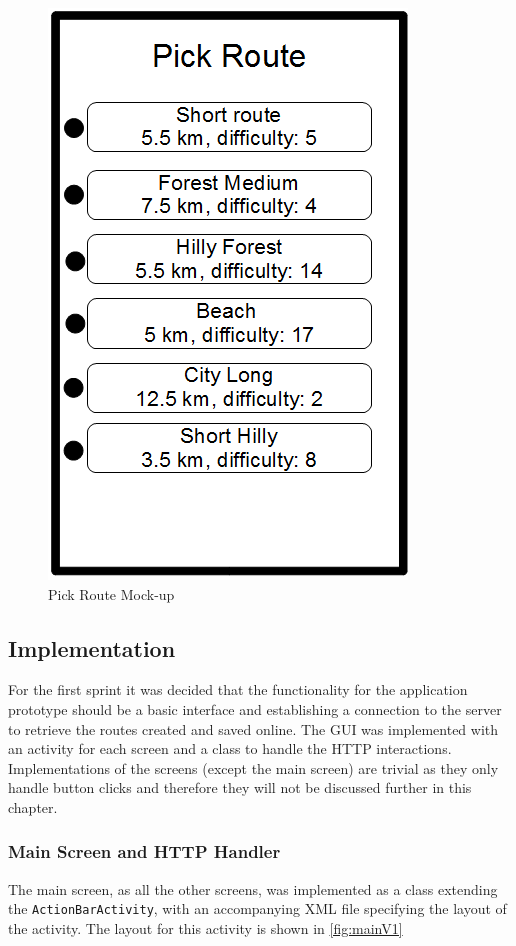\begin{figure}[ht]
\begin{center}
 \caption{Pick Route Mock-up}
 \label{fig:pickRouteMock}
 \includegraphics[scale=0.4]{img/pickRouteMock.png}
\end{center}
\end{figure}

\subsection{Implementation}
For the first sprint it was decided that the functionality for the application prototype should be a basic interface and establishing a connection to the server to retrieve the routes created and saved online. The \ac{GUI} was implemented with an activity for each screen and a class to handle the \ac{HTTP} interactions. Implementations of the screens (except the main screen) are trivial as they only handle button clicks and therefore they will not be discussed further in this chapter.

\subsubsection{Main Screen and HTTP Handler}
The main screen, as all the other screens, was implemented as a class extending the \texttt{ActionBarActivity}, with an accompanying \ac{XML} file specifying the layout of the activity. The layout for this activity is shown in \autoref{fig:mainV1} 

